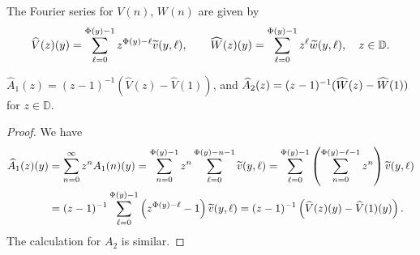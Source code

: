 \documentclass[AHL,Unicode,longabstracts,published]{cedram}
\newcommand{\D}{\mathbb{D}}
\newcommand{\hA}{\widehat{A}}
\newcommand{\hV}{\widehat{V}}
\newcommand{\hW}{\widehat{W}}
\newcommand{\tw}{\widetilde{w}}
\newcommand{\tv}{\tilde{v}}
\let\oldtilde\tilde
\renewcommand*{\tilde}[1]{\mathchoice{\widetilde{#1}}{\widetilde{#1}}{\oldtilde{#1}}{\oldtilde{#1}}}
\begin{document}
The Fourier series for $V(n)$, $W(n)$ are given by
\[
\hV(z)(y)=\sum_{\ell=0}^{\Phi(y)-1} z^{\Phi(y)-\ell}\tv(y,\ell), \qquad
\hW(z)(y)=\sum_{\ell=0}^{\Phi(y)-1} z^\ell\tw(y,\ell),\quad z\in\D.
\]

\begin{prop}\label{prop:AA}
$\hA_1(z) =(z-1)^{-1}(\hV(z)-\hV(1))$, and $\hA_2(z)= (z-1)^{-1}\linebreak(\hW(z)-\hW(1))$ for $z\in\D$.
\end{prop}

\begin{proof}
We have
\begin{align*}
\hA_1(z)(y) & =\sum_{n=0}^\infty z^nA_1(n)(y) =\sum_{n=0}^{\Phi(y)-1} z^n\sum_{\ell=0}^{\Phi(y)-n-1}\tv(y,\ell) =\sum_{\ell=0}^{\Phi(y)-1} \left(\sum_{n=0}^{\Phi(y)-\ell-1}z^n\right)\tv(y,\ell)
\\ & =(z-1)^{-1}\sum_{\ell=0}^{\Phi(y)-1}\left(z^{\Phi(y)-\ell}-1\right)\tv(y,\ell) =(z-1)^{-1}\left(\hV(z)(y)-\hV(1)(y)\right).
\end{align*}
The calculation for $A_2$ is similar.
\end{proof}

\goodbreak
\end{document}
